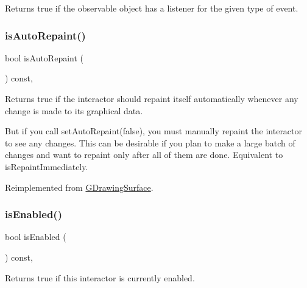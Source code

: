 Returns true if the observable object has a listener for the given type of event. 

\mbox{\label{classsgl_1_1GCanvas_a189881032e2b355095790b83b2454d8d}} 
\subsubsection{\texorpdfstring{is\+Auto\+Repaint()}{isAutoRepaint()}}
{\footnotesize\ttfamily bool is\+Auto\+Repaint (\begin{DoxyParamCaption}{ }\end{DoxyParamCaption}) const\hspace{0.3cm}{\ttfamily [override]}, {\ttfamily [virtual]}}



Returns true if the interactor should repaint itself automatically whenever any change is made to its graphical data. 

But if you call set\+Auto\+Repaint(false), you must manually repaint the interactor to see any changes. This can be desirable if you plan to make a large batch of changes and want to repaint only after all of them are done. Equivalent to is\+Repaint\+Immediately. 

Reimplemented from \mbox{\hyperlink{classsgl_1_1GDrawingSurface_a12c8d52ddfcaa5448ec4bace92ddee6c}{G\+Drawing\+Surface}}.

\mbox{\label{classsgl_1_1GInteractor_aacb819fb241851fd9fc045271baa4034}} 
\subsubsection{\texorpdfstring{is\+Enabled()}{isEnabled()}}
{\footnotesize\ttfamily bool is\+Enabled (\begin{DoxyParamCaption}{ }\end{DoxyParamCaption}) const\hspace{0.3cm}{\ttfamily [virtual]}, {\ttfamily [inherited]}}



Returns true if this interactor is currently enabled. 

